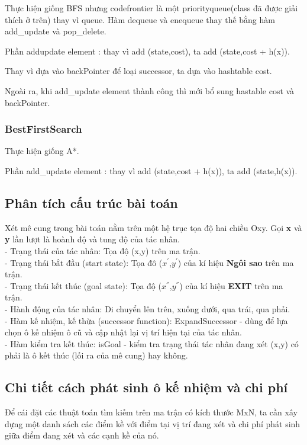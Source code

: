 \documentclass[11pt]{scrartcl} %
\begin{document}
Thực hiện giống BFS nhưng code{frontier} là một priorityqueue(class đã được giải thích ở trên) thay vì queue. Hàm dequeue và enequeue thay thế bằng hàm add\_update và pop\_delete.

Phần addupdate element : thay vì add (state,cost), ta add (state,cost + h(x)).

Thay vì dựa vào backPointer để loại successor, ta dựa vào hashtable cost.

Ngoài ra, khi add\_update element thành công thì mới bổ sung hastable cost và backPointer.



\subsubsection{BestFirstSearch}
Thực hiện giống A*.

Phần add\_update element : thay vì add (state,cost + h(x)), ta add (state,h(x)).
\subsection{Phân tích cấu trúc bài toán}
Xét mê cung trong bài toán nằm trên một hệ trục tọa độ hai chiều Oxy. Gọi \textbf{x} và \textbf{y} lần lượt là hoành độ và tung độ của tác nhân.\\
- Trạng thái của tác nhân: Tọa độ (x,y) trên ma trận.\\
- Trạng thái bắt đầu (start state): Tọa đô ($x^{'}$,$y^{'}$) của kí hiệu \textbf{Ngôi sao} trên ma trận.\\
- Trạng thái kết thúc (goal state): Tọa độ ($x^{''}$,$y^{''}$) của kí hiệu \textbf{EXIT} trên ma trận.\\
- Hành động của tác nhân: Di chuyển lên trên, xuống dưới, qua trái, qua phải.\\
- Hàm kế nhiệm, kế thừa (successor function): ExpandSuccessor - dùng để lựa chọn ô kế nhiệm ô cũ và cập nhật lại vị trí hiện tại của tác nhân.\\
- Hàm kiểm tra kết thúc: isGoal - kiểm tra trạng thái tác nhân đang xét (x,y) có phải là ô kết thúc (lối ra của mê cung) hay không.
\subsection{Chi tiết cách phát sinh ô kế nhiệm và chi phí}
Để cái đặt các thuật toán tìm kiếm trên ma trận có kích thước MxN, ta cần xây dựng một danh sách các điểm kề với điểm tại vị trí đang xét và chi phí phát sinh giữa điểm đang xét và các cạnh kề của nó.\\
\end{document}

